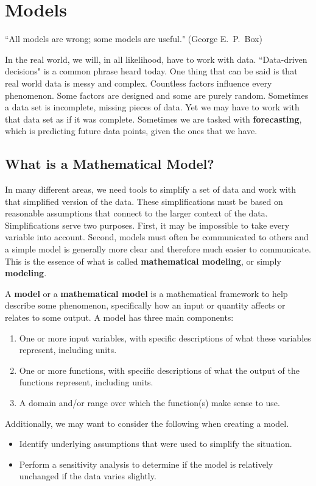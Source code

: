 \section{Models}
\label{sec:models}

\begin{center}
``All models are wrong; some models are useful." (George E.\ P.\ Box)
\end{center}

In the real world, we will, in all likelihood, have to work with data. ``Data-driven decisions" is a common phrase heard today. One thing that can be said is that real world data is messy and complex. Countless factors influence every phenomenon. Some factors are designed and some are purely random. Sometimes a data set is incomplete, missing pieces of data. Yet we may have to work with that data set as if it was complete. Sometimes we are tasked with {\bf forecasting}, which is predicting future data points, given the ones that we have.

\subsection{What is a Mathematical Model?}
\label{ssec:models}
In many different areas, we need tools to simplify a set of data and work with that simplified version of the data. These simplifications must be based on reasonable assumptions that connect to the larger context of the data. Simplifications serve two purposes. First, it may be impossible to take every variable into account. Second, models must often be communicated to others and a simple model is generally more clear and therefore much easier to communicate. This is the essence of what is called {\bf mathematical modeling}, or simply {\bf modeling}.

\begin{definition}
A {\bf model}  or a {\bf mathematical model} is a mathematical framework to help describe some phenomenon, specifically how an input or quantity affects or relates to some output.  A model has three main components:
\begin{enumerate}
    \item One or more input variables, with specific descriptions of what these variables represent, including units.
    \item One or more functions, with specific descriptions of what the output of the functions represent, including units.
    \item A domain and/or range over which the function(s) make sense to use.
\end{enumerate}
Additionally, we may want to consider the following when creating a model.
\begin{itemize}
    \item Identify underlying assumptions that were used to simplify the situation.
    \item Perform a sensitivity analysis to determine if the model is relatively unchanged if the data varies slightly.
\end{itemize}
\end{definition}

